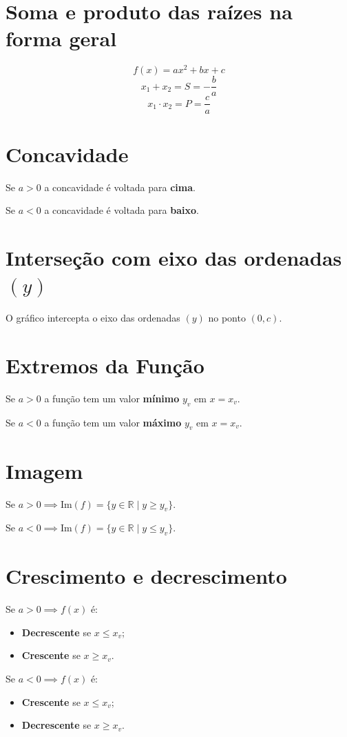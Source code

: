 \documentclass[12pt,a4paper]{report}
\begin{document}
	\section{Soma e produto das raízes na forma geral}
	\begin{destaque}
		$$f(x) = ax^2 + bx + c$$
		$$x_1 + x_2 = S = - \dfrac{b}{a}$$
		$$x_1 \cdot x_2 = P = \dfrac{c}{a}$$
	\end{destaque}
\section{Concavidade}
\begin{destaque}[Concavidade]
	Se $a>0$ a concavidade é voltada para \textbf{cima}.
	
	Se $a<0$ a concavidade é voltada para \textbf{baixo}.
\end{destaque}
\section{Interseção com eixo das ordenadas $(y)$}
\begin{destaque}
	O gráfico intercepta o eixo das ordenadas $(y)$ no ponto $(0, c)$.
\end{destaque}
\section{Extremos da Função}
\begin{destaque}
	Se $a>0$ a função tem um valor \textbf{mínimo} $y_v$ em $x=x_v$.
	
	Se $a<0$ a função tem um valor \textbf{máximo} $y_v$ em $x=x_v$.
\end{destaque}
\section{Imagem}
\begin{destaque}[Imagem]
	Se $a > 0 \implies \text{Im}(f)=\{y \in \mathbb{R} \mid y \geqslant y_v \}$.
	
	Se $a<0 \implies \text{Im}(f)=\{y \in \mathbb{R} \mid y \leqslant y_v \}$.
\end{destaque}
\section{Crescimento e decrescimento}
	\begin{destaque}
	Se $a>0 \implies f(x)$ é:
	\begin{itemize}
		\item \textbf{Decrescente} se $x\leqslant x_v$;
		\item \textbf{Crescente} se $x \geqslant x_v$.
	\end{itemize}
	Se $a<0 \implies f(x)$ é:
	\begin{itemize}
		\item \textbf{Crescente} se $x\leqslant x_v$;
		\item \textbf{Decrescente} se $x\geqslant x_v$.
	\end{itemize}
\end{destaque}
\end{document}
